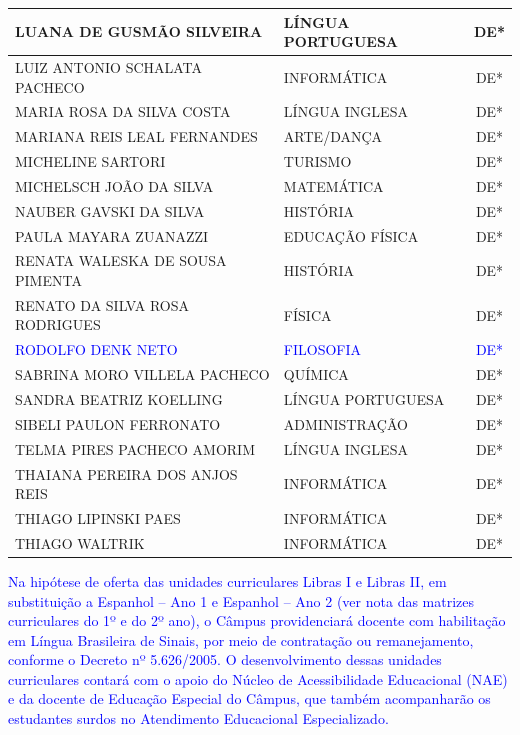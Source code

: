 \documentclass{../../modelos/latex-shared/ifsc-ppc}
\newcommand{\revisao}[1]{\textcolor{blue}{#1}}
\newcommand{\revisao}[1]{#1}
\begin{document}
\begin{xltabular}{\linewidth}{|X|p{4cm}|c|}
LUANA DE GUSMÃO SILVEIRA & LÍNGUA PORTUGUESA & DE* \\ \hline
LUIZ ANTONIO SCHALATA PACHECO & INFORMÁTICA & DE* \\ \hline
MARIA ROSA DA SILVA COSTA & LÍNGUA INGLESA & DE* \\ \hline
MARIANA REIS LEAL FERNANDES & ARTE/DANÇA & DE* \\ \hline
MICHELINE SARTORI & TURISMO & DE* \\ \hline
MICHELSCH JOÃO DA SILVA & MATEMÁTICA & DE* \\ \hline
NAUBER GAVSKI DA SILVA & HISTÓRIA & DE* \\ \hline
PAULA MAYARA ZUANAZZI & EDUCAÇÃO FÍSICA & DE* \\ \hline
RENATA WALESKA DE SOUSA PIMENTA & HISTÓRIA & DE* \\ \hline
RENATO DA SILVA ROSA RODRIGUES & FÍSICA & DE* \\ \hline
\revisao{RODOLFO DENK NETO} & \revisao{FILOSOFIA} & \revisao{DE*} \\ \hline
SABRINA MORO VILLELA PACHECO & QUÍMICA & DE* \\ \hline
SANDRA BEATRIZ KOELLING & LÍNGUA PORTUGUESA & DE* \\ \hline
SIBELI PAULON FERRONATO & ADMINISTRAÇÃO & DE* \\ \hline
TELMA PIRES PACHECO AMORIM & LÍNGUA INGLESA & DE* \\ \hline
THAIANA PEREIRA DOS ANJOS REIS & INFORMÁTICA & DE* \\ \hline
THIAGO LIPINSKI PAES & INFORMÁTICA & DE* \\ \hline
THIAGO WALTRIK & INFORMÁTICA & DE* \\ \hline
\end{xltabular}

\revisao{Na hipótese de oferta das unidades curriculares Libras I e Libras II, em substituição a Espanhol -- Ano 1 e Espanhol -- Ano 2 (ver nota das matrizes curriculares do 1º e do 2º ano), o Câmpus providenciará docente com habilitação em Língua Brasileira de Sinais, por meio de contratação ou remanejamento, conforme o Decreto nº 5.626/2005. O desenvolvimento dessas unidades curriculares contará com o apoio do Núcleo de Acessibilidade Educacional (NAE) e da docente de Educação Especial do Câmpus, que também acompanharão os estudantes surdos no Atendimento Educacional Especializado.}
\end{document}

